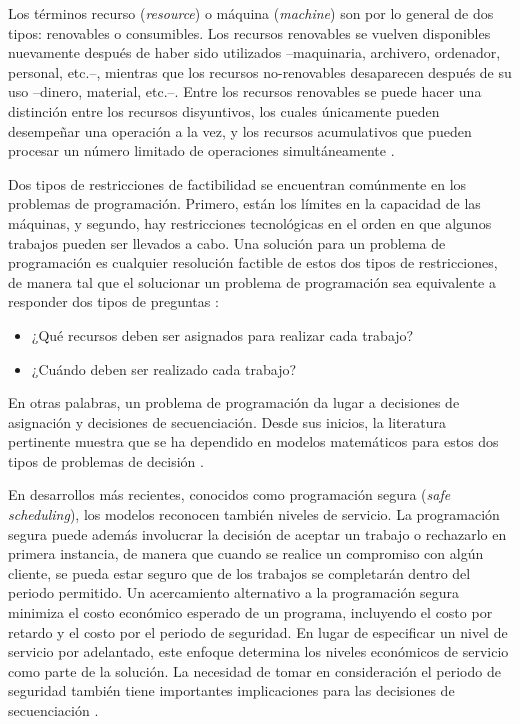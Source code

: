\documentclass[spanish,draft,12pt,headsepline,footsepline,paper=letter]{scrreprt}
\begin{document}
Los términos recurso (\textit{resource}) o máquina (\textit{machine}) son por lo general de dos tipos: renovables o consumibles. Los recursos renovables se vuelven disponibles nuevamente después de haber sido utilizados –maquinaria, archivero, ordenador, personal, etc.–, mientras que los recursos no\nobreakdash-renovables desaparecen después de su uso –dinero, material, etc.–. Entre los recursos renovables se puede hacer una distinción entre los recursos disyuntivos, los cuales únicamente pueden desempeñar una operación a la vez, y los recursos acumulativos que pueden procesar un número limitado de operaciones simultáneamente \citep[p.~6]{TKindt2002}.

Dos tipos de restricciones de factibilidad se encuentran comúnmente en los problemas de programación. Primero, están los límites en la capacidad de las máquinas, y segundo, hay restricciones tecnológicas en el orden en que algunos trabajos pueden ser llevados a cabo. Una solución para un problema de programación es cualquier resolución factible de estos dos tipos de restricciones, de manera tal que el solucionar un problema de programación sea equivalente a responder dos tipos de preguntas \citep[p.~4]{Baker2009}:

\begin{itemize}
\setlength{\itemsep}{0cm}%
\setlength{\parskip}{0cm}%
\item¿Qué recursos deben ser asignados para realizar cada trabajo?
\item¿Cuándo deben ser realizado cada trabajo?
\end{itemize}

En otras palabras, un problema de programación da lugar a decisiones de asignación y decisiones de secuenciación. Desde sus inicios, la literatura pertinente muestra que se ha dependido en modelos matemáticos para estos dos tipos de problemas de decisión \citep[p.~4,~5]{Baker2009}.

En desarrollos más recientes, conocidos como programación segura (\textit{safe scheduling}), los modelos reconocen también niveles de servicio. La programación segura puede además involucrar la decisión de aceptar un trabajo o rechazarlo en primera instancia, de manera que cuando se realice un compromiso con algún cliente, se pueda estar seguro que de los trabajos se completarán dentro del periodo permitido. Un acercamiento alternativo a la programación segura minimiza el costo económico esperado de un programa, incluyendo el costo por retardo y el costo por el periodo de seguridad. En lugar de especificar un nivel de servicio por adelantado, este enfoque determina los niveles económicos de servicio como parte de la solución. La necesidad de tomar en consideración el periodo de seguridad también tiene importantes implicaciones para las decisiones de secuenciación \citep[p.~5]{Baker2009}.
\end{document}

